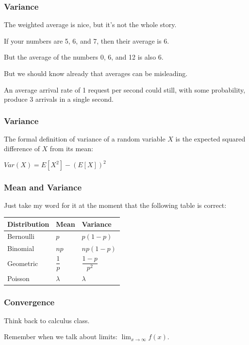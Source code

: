 \begin{frame}
\frametitle{Variance}

The weighted average is nice, but it's not the whole story. 

If your numbers are 5, 6, and 7, then their average is 6. 

But the average of the numbers 0, 6, and 12 is also 6. 

But we should know already that averages can be misleading.

An average arrival rate of 1 request per second could still, with some probability, produce 3 arrivals in a single second.

\end{frame}



\begin{frame}
\frametitle{Variance}

The formal definition of variance of a random variable $X$ is the expected squared difference of $X$ from its mean:

\begin{center}
	$Var(X) = E[X^{2}] - (E[X])^{2}$
\end{center}


\end{frame}



\begin{frame}
\frametitle{Mean and Variance}

Just take my word for it at the moment that the following table is correct:

\begin{center}
\begin{tabular}{|l|l|l|}
	\hline
	\textbf{Distribution} & \textbf{Mean} & \textbf{Variance}\\ \hline
	Bernoulli & $p$ & $p(1-p)$\\ \hline
	Binomial & $np$ & $np(1-p)$\\ \hline
	Geometric & $\dfrac{1}{p}$ & $\dfrac{1-p}{p^{2}}$ \\ \hline
	Poisson & $\lambda$ & $\lambda$\\ \hline
\end{tabular}
\end{center}

\end{frame}



\begin{frame}
\frametitle{Convergence}

Think back to calculus class. 

Remember when we talk about limits: $\lim_{x\to\infty} f(x)$. 


\end{frame}



